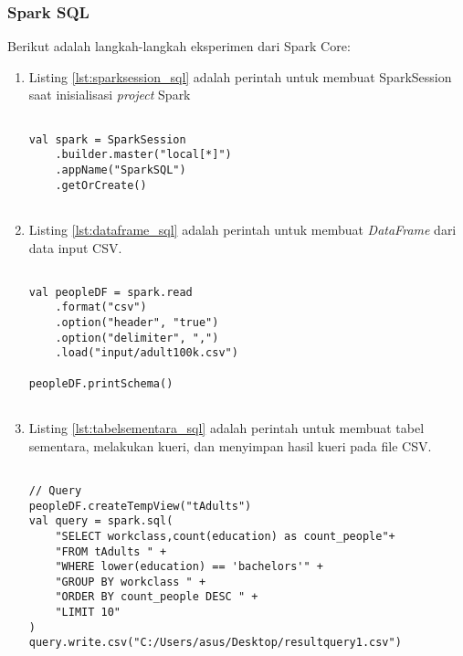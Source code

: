 \subsubsection{Spark SQL}
\noindent Berikut adalah langkah-langkah eksperimen dari Spark Core:
\begin{enumerate}

\item Listing \ref{lst:sparksession_sql} adalah perintah untuk membuat SparkSession saat inisialisasi \textit{project} Spark
\begin{lstlisting}[basicstyle=\ttfamily, frame=single,
	columns=fullflexible, keepspaces=true, breaklines=true, label=lst:sparksession_sql, caption=Membuat Perintah SparkSession]
	
val spark = SparkSession
	.builder.master("local[*]")
	.appName("SparkSQL")
	.getOrCreate()	
	
\end{lstlisting}

\newpage
\item Listing \ref{lst:dataframe_sql} adalah perintah untuk membuat \textit{DataFrame} dari data input CSV.
\begin{lstlisting}[basicstyle=\ttfamily, frame=single,
	columns=fullflexible, keepspaces=true, breaklines=true, label=lst:dataframe_sql, caption=Membuat Dataframe]
	
val peopleDF = spark.read
	.format("csv")
	.option("header", "true")
	.option("delimiter", ",")
	.load("input/adult100k.csv")

peopleDF.printSchema()	
	
\end{lstlisting}

\item Listing \ref{lst:tabelsementara_sql} adalah perintah untuk membuat tabel sementara, melakukan kueri, dan menyimpan hasil kueri pada file CSV.
\begin{lstlisting}[basicstyle=\ttfamily, frame=single,
	columns=fullflexible, keepspaces=true, breaklines=true, label=lst:tabelsementara_sql, caption=Membuat Tabel Sementara]
	
// Query
peopleDF.createTempView("tAdults")
val query = spark.sql(
	"SELECT workclass,count(education) as count_people"+
	"FROM tAdults " +
	"WHERE lower(education) == 'bachelors'" +
	"GROUP BY workclass " +
	"ORDER BY count_people DESC " +
	"LIMIT 10"
)	
query.write.csv("C:/Users/asus/Desktop/resultquery1.csv")
	
\end{lstlisting}


\end{enumerate}
